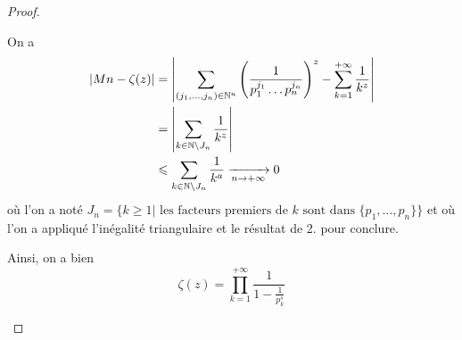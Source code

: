 \documentclass[12pt]{article}
\begin{document}
\begin{proof}
\begin{enumerate}
		On a 
		\begin{align}
			\left\vert\Pi_{n}-\zeta(z)\right\vert
			&=\left\vert\sum_{(j_{1},\dots,j_{n})\in\N^{n}}\left(\frac{1}{p_{1}^{j_{1}}\dots p_{n}^{j_{n}}}\right)^{z}-\sum_{k=1}^{+\infty}\frac{1}{k^{z}}\right\vert\\
			&=\left\vert\sum_{k\in\N\setminus J_{n}}\frac{1}{k^{z}}\right\vert\\
			&\leqslant \sum_{k\in\N\setminus J_{n}}\frac{1}{k^{a}}\xrightarrow[n\to+\infty]{}0
		\end{align}
		où l'on a noté $J_{n}=\{k\geqslant 1|\text{ les facteurs premiers de }k\text{ sont dans }\{p_{1},\dots,p_{n}\}\}$ et où l'on a appliqué l'inégalité triangulaire et le résultat de 2. pour conclure.

		Ainsi, on a bien 
		\begin{equation}\boxed{\zeta(z)=\prod_{k=1}^{+\infty}\frac{1}{1-\frac{1}{p_{k}^{s}}}}\end{equation}
	\end{enumerate}
\end{proof}
\end{document}
